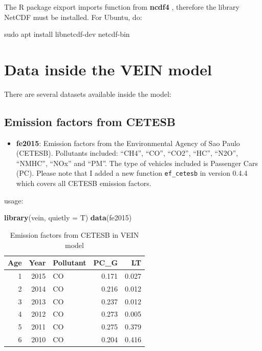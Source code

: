 \documentclass[12pt,graybox,envcountchap,sectrefs]{krantz}
\makeatletter
\newenvironment{Shaded}{\begin{snugshade}}{\end{snugshade}}
\newcommand{\KeywordTok}[1]{\textcolor[rgb]{0.13,0.29,0.53}{\textbf{#1}}}
\newcommand{\DataTypeTok}[1]{\textcolor[rgb]{0.13,0.29,0.53}{#1}}
\newcommand{\FunctionTok}[1]{\textcolor[rgb]{0.00,0.00,0.00}{#1}}
\newcommand{\NormalTok}[1]{#1}
\providecommand{\tightlist}{%
  \setlength{\itemsep}{0pt}\setlength{\parskip}{0pt}}
\newenvironment{kframe}{%
\medskip{}
\setlength{\fboxsep}{.8em}
 \def\at@end@of@kframe{}%
 \ifinner\ifhmode%
  \def\at@end@of@kframe{\end{minipage}}%
  \begin{minipage}{\columnwidth}%
 \fi\fi%
 \def\FrameCommand##1{\hskip\@totalleftmargin \hskip-\fboxsep
 \colorbox{shadecolor}{##1}\hskip-\fboxsep
     \hskip-\linewidth \hskip-\@totalleftmargin \hskip\columnwidth}%
 \MakeFramed {\advance\hsize-\width
   \@totalleftmargin\z@ \linewidth\hsize
   \@setminipage}}%
 {\par\unskip\endMakeFramed%
 \at@end@of@kframe}
\renewenvironment{Shaded}{\begin{kframe}}{\end{kframe}}
\theoremstyle{definition}
\theoremstyle{definition}
\theoremstyle{definition}
\theoremstyle{remark}
\makeatother
\begin{document}
The R package eixport imports function from \textbf{ncdf4}
\citep{ncdf4}, therefore the library NetCDF must be installed. For
Ubuntu, do:

\begin{Shaded}
\begin{Highlighting}[]
\FunctionTok{sudo}\NormalTok{ apt install libnetcdf-dev  netcdf-bin }
\end{Highlighting}
\end{Shaded}

\section{Data inside the VEIN model}\label{data-inside-the-vein-model}

There are several datasets available inside the model:

\subsection{Emission factors from
CETESB}\label{emission-factors-from-cetesb}

\begin{itemize}
\tightlist
\item
  \textbf{fe2015}: Emission factors from the Environmental Agency of Sao
  Paulo (CETESB). Pollutants included: ``CH4'', ``CO'', ``CO2'', ``HC'',
  ``N2O'', ``NMHC'', ``NOx'' and ``PM''. The type of vehicles included
  is Passenger Cars (PC). Please note that I added a new function
  \texttt{ef\_cetesb} in version 0.4.4 which covers all CETESB emission
  factors.
\end{itemize}

usage:

\begin{Shaded}
\begin{Highlighting}[]
\KeywordTok{library}\NormalTok{(vein, }\DataTypeTok{quietly =}\NormalTok{ T)}
\KeywordTok{data}\NormalTok{(fe2015)}
\end{Highlighting}
\end{Shaded}

\begin{table}

\caption{\label{tab:unnamed-chunk-10}Emission factors from CETESB in VEIN model}
\centering
\begin{tabular}[t]{rrlrr}
\toprule
Age & Year & Pollutant & PC\_G & LT\\
\midrule
1 & 2015 & CO & 0.171 & 0.027\\
2 & 2014 & CO & 0.216 & 0.012\\
3 & 2013 & CO & 0.237 & 0.012\\
4 & 2012 & CO & 0.273 & 0.005\\
5 & 2011 & CO & 0.275 & 0.379\\
6 & 2010 & CO & 0.204 & 0.416\\
\bottomrule
\end{tabular}
\end{table}
\end{document}
